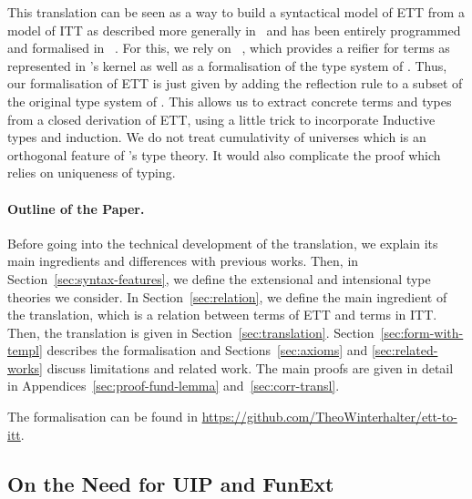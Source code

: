 This translation can be seen as a way to build a syntactical model of
ETT from a model of ITT as described more generally
in~ and has been entirely
programmed and
formalised in
\Coq~. For this, we rely on
\TemplateCoq{}~,
which provides a reifier for \Coq terms as represented in \Coq's kernel
as well as a formalisation of the type system of \Coq.
%
Thus, our formalisation of ETT is just given by adding the reflection
rule to a subset of the original type system of \Coq.
%
This allows us to extract concrete \Coq terms and types from a closed
derivation of ETT, using a little trick to incorporate Inductive types
and induction. We do not treat cumulativity of universes which is an
orthogonal feature of \Coq's type theory. It would also complicate the
proof which relies on uniqueness of typing.

\paragraph*{Outline of the Paper.}

Before going into the technical development of the translation, we
explain its main ingredients and differences with previous works.
Then, in Section~\ref{sec:syntax-features}, we define the extensional
and intensional type theories we consider. In
Section~\ref{sec:relation}, we define the main ingredient of the
translation, which is a relation between terms of ETT and terms in ITT.
%
Then, the translation is given in Section~\ref{sec:translation}.
Section~\ref{sec:form-with-templ} describes the \Coq formalisation and
Sections~\ref{sec:axioms} and \ref{sec:related-works} discuss
limitations and related work.
%
The main proofs are given in detail in Appendices~\ref{sec:proof-fund-lemma}
and~\ref{sec:corr-transl}.


The \Coq formalisation can be found in
\url{https://github.com/TheoWinterhalter/ett-to-itt}.


\subsection{On the Need for UIP and FunExt}


